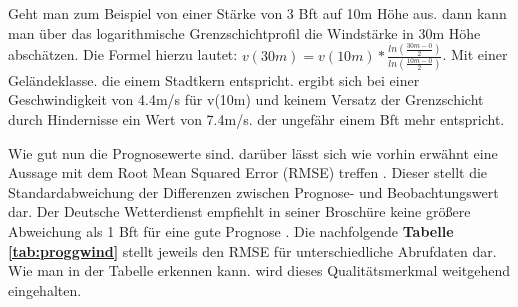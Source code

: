 Geht man zum Beispiel von einer Stärke von 3 Bft auf 10m Höhe aus. dann kann man über das logarithmische Grenzschichtprofil die Windstärke in 30m Höhe abschätzen. Die Formel hierzu lautet: \(v(30m) = v(10m)*\frac{ln(\frac{30m-0}{2})}{ln(\frac{10m-0}{2})}\). Mit einer Geländeklasse. die einem Stadtkern entspricht. ergibt sich bei einer Geschwindigkeit von 4.4m/s für v(10m) und keinem Versatz der Grenzschicht durch Hindernisse ein Wert von 7.4m/s. der ungefähr einem Bft mehr entspricht. \cite{GrenzProf}

Wie gut nun die Prognosewerte sind. darüber lässt sich wie vorhin erwähnt eine Aussage mit dem Root Mean Squared Error (RMSE) treffen \cite{DWD}. Dieser stellt die Standardabweichung der Differenzen zwischen Prognose- und Beobachtungswert dar. Der Deutsche Wetterdienst empfiehlt in seiner Broschüre keine größere Abweichung als 1 Bft für eine gute Prognose \cite{DWD}. Die nachfolgende \textbf{Tabelle \ref{tab:proggwind}} stellt jeweils den RMSE für unterschiedliche Abrufdaten dar. Wie man in der Tabelle erkennen kann. wird dieses Qualitätsmerkmal weitgehend eingehalten. 
